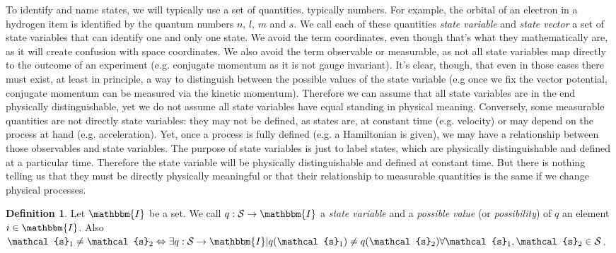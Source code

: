 \documentclass[aps,pra,10pt,twocolumn,floatfix,nofootinbib]{revtex4-1}
\theoremstyle{definition}
\newtheorem{defn}[prop]{Definition}
\begin{document}
To identify and name states, we will typically use a set of quantities, typically numbers. For example, the orbital of an electron in a hydrogen item is identified by the quantum numbers $n$, $l$, $m$ and $s$. We call each of these quantities \emph{state variable} and \emph{state vector} a set of state variables that can identify one and only one state. We avoid the term coordinates, even though that's what they mathematically are, as it will create confusion with space coordinates. We also avoid the term observable or measurable, as not all state variables map directly to the outcome of an experiment (e.g. conjugate momentum as it is not gauge invariant). It's clear, though, that even in those cases there must exist, at least in principle, a way to distinguish between the possible values of the state variable (e.g once we fix the vector potential, conjugate momentum can be measured via the kinetic momentum). Therefore we can assume that all state variables are in the end physically distinguishable, yet we do not assume all state variables have equal standing in physical meaning. Conversely, some measurable quantities are not directly state variables: they may not be defined, as states are, at constant time (e.g. velocity) or may depend on the process at hand (e.g. acceleration). Yet, once a process is fully defined (e.g. a Hamiltonian is given), we may have a relationship between those observables and state variables. The purpose of state variables is just to label states, which are physically distinguishable and defined at a particular time. Therefore the state variable will be physically distinguishable and defined at constant time. But there is nothing telling us that they must be directly physically meaningful or that their relationship to measurable quantities is the same if we change physical processes.

\begin{defn}\label{state_variable}
Let $\mathbbm{I}$ be a set. We call $q : \mathcal{S} \rightarrow \mathbbm{I}$ a \emph{state variable} and a \emph{possible value} (or \emph{possibility}) of $q$ an element $i \in \mathbbm{I}$. Also $\mathcal{s}_1 \neq \mathcal{s}_2 \Leftrightarrow \exists q : \mathcal{S} \rightarrow \mathbbm{I} | q(\mathcal{s}_1)\neq q(\mathcal{s}_2) \forall \mathcal{s}_1, \mathcal{s}_2 \in \mathcal{S}$.
\end{defn}
\end{document}
